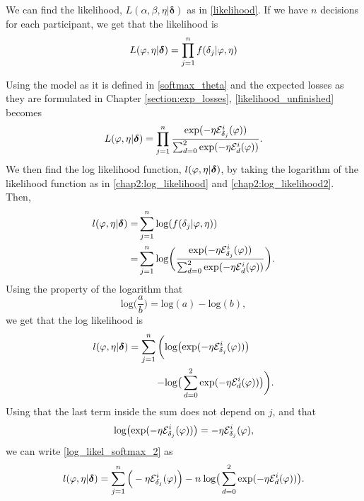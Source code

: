 We can find the likelihood, $L(\alpha,\beta,\eta|\boldsymbol{\delta})$ as in \eqref{likelihood}. If we have $n$ decisions for each participant, we get that the likelihood is 
\begin{equation}
\label{likelihood_unfinished}
    \begin{aligned}
       L(\varphi,\eta|\boldsymbol{\delta}) = \prod_{j=1}^n f(\delta_j|\varphi,\eta)
    \end{aligned}
\end{equation}

Using the model as it is defined in  \eqref{softmax_theta} and the expected losses as they are formulated in Chapter \ref{section:exp_losses}, \eqref{likelihood_unfinished} becomes
\begin{equation}
\label{likelihood_softmax}
    L(\varphi,\eta|\boldsymbol{\delta}) = \prod_{j=1}^n \frac{\text{exp}(- \eta \mathcal{E}^i_{\delta_{j}}(\varphi))}{\sum_{d=0}^{2} \text{exp}(-\eta \mathcal{E}^i_{d}(\varphi))}.
\end{equation}
We then find the log likelihood function, $l(\varphi,\eta|\boldsymbol{\delta})$, by taking the logarithm of the likelihood function as in \eqref{chap2:log_likelihood} and \eqref{chap2:log_likelihood2}. Then,
\begin{equation}
\label{log_likel_softmax_1}
    \begin{aligned}
       l(\varphi,\eta|\boldsymbol{\delta})
       =& \sum_{j=1}^n \text{log} (f(\delta_j|\varphi,\eta)) \\
       =& \sum_{j=1}^n \text{log} \bigg( \frac{\text{exp}(- \eta \mathcal{E}^i_{\delta_{j}}(\varphi))}{\sum_{d=0}^{2} \text{exp}(-\eta \mathcal{E}^i_{d}(\varphi))} \bigg).
    \end{aligned}
\end{equation}
Using the property of the logarithm that 
\begin{equation}
    \text{log}\Big(\frac{a}{b} \Big) = \text{log}(a) - \text{log}(b),
\end{equation}
we get that the log likelihood is
\begin{equation}
\label{log_likel_softmax_2}
    \begin{aligned}
       l(\varphi,\eta|\boldsymbol{\delta})
       = \sum_{j=1}^n \bigg( &\text{log} \big( \text{exp}(- \eta \mathcal{E}^i_{\delta_{j}}(\varphi))\big)\\
       - &\text{log} \big( \sum_{d=0}^{2} \text{exp}(-\eta \mathcal{E}^i_{d}(\varphi)) \big)
       \bigg).
    \end{aligned}
\end{equation}
Using that the last term inside the sum does not depend on $j$, and that 
\begin{equation*}
    \text{log} \big( \text{exp}(- \eta \mathcal{E}^i_{\delta_{j}}(\varphi))\big)
    = - \eta \mathcal{E}^i_{\delta_{j}}(\varphi),
\end{equation*}
we can write \eqref{log_likel_softmax_2} as
\begin{equation}
\label{log_likelihood_softmax}
    \begin{aligned}
       l(\varphi,\eta|\boldsymbol{\delta})
       = \sum_{j=1}^n \Big( - \eta \mathcal{E}^i_{\delta_{j}}(\varphi) \Big)
       - n \: \text{log} \big( \sum_{d=0}^{2} \text{exp}(-\eta \mathcal{E}^i_{d}(\varphi)) \big).
    \end{aligned}
\end{equation}

